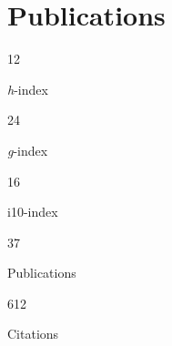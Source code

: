 \documentclass[11pt,a4paper,]{awesome-cv}
\begin{document}
\hypertarget{publications}{%
\section{Publications}\label{publications}}

\begin{tcolorbox}[enhanced,
        on line, 
        boxsep=4pt, left=0pt,right=0pt,top=0pt,bottom=0pt,
        colframe=white,colback=teal,
        hyperurl={https://scholar.google.com/citations?user=8Q0jKHsAAAAJ}]
  
\color{white}
\begin{minipage}[c]{0.195\linewidth}
  \begin{center} \begin{huge} 12 \end{huge}
  \begin{small} \textit{h}-index \end{small} \end{center} 
\end{minipage} \begin{minipage}[c]{0.195\linewidth}
  \begin{center} \begin{huge} 24 \end{huge}
  \begin{small} \textit{g}-index \end{small} \end{center}
\end{minipage} \begin{minipage}[c]{0.195\linewidth}
  \begin{center} \begin{huge} 16 \end{huge}
  \begin{small} i10-index \end{small} \end{center}
\end{minipage} \begin{minipage}[c]{0.195\linewidth}
  \begin{center} \begin{huge} 37 \end{huge}
  \begin{small} Publications \end{small} \end{center}
\end{minipage} \begin{minipage}[c]{0.195\linewidth}  
  \begin{center} \begin{huge} 612 \end{huge} 
  \begin{small} Citations \end{small} \end{center}
\end{minipage}
\end{tcolorbox}
\end{document}
